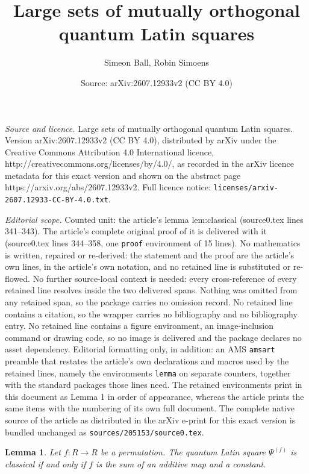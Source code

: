 \documentclass[10pt,a4paper]{amsart}
\title{Large sets of mutually orthogonal quantum Latin squares}
\author{Simeon Ball, Robin Simoens}
\date{Source: arXiv:2607.12933v2 (CC BY 4.0)}
\newtheorem{lemma}{Lemma}
\begin{document}
\maketitle

\noindent\emph{Source and licence.} Large sets of mutually orthogonal quantum Latin squares. Version arXiv:2607.12933v2 (CC BY 4.0), distributed by arXiv under the Creative Commons Attribution 4.0 International licence, http://creativecommons.org/licenses/by/4.0/, as recorded in the arXiv licence metadata for this exact version and shown on the abstract page https://arxiv.org/abs/2607.12933v2. Full licence notice: \texttt{licenses/arxiv-2607.12933-CC-BY-4.0.txt}.\par\smallskip

\noindent\textit{Editorial scope.} Counted unit: the article's lemma lem:classical (source0.tex lines 341--343). The article's complete original proof of it is delivered with it (source0.tex lines 344--358, one \texttt{proof} environment of 15 lines). No mathematics is written, repaired or re-derived: the statement and the proof are the article's own lines, in the article's own notation, and no retained line is substituted or re-flowed.  No further source-local context is needed: every cross-reference of every retained line resolves inside the two delivered spans.  Nothing was omitted from any retained span, so the package carries no omission record.  No retained line contains a citation, so the wrapper carries no bibliography and no bibliography entry.  No retained line contains a figure environment, an image-inclusion command or drawing code, so no image is delivered and the package declares no asset dependency.  Editorial formatting only, in addition: an AMS \texttt{amsart} preamble that restates the article's own declarations and macros used by the retained lines, namely the environments \texttt{lemma} on separate counters, together with the standard packages those lines need.  The retained environments print in this document as Lemma 1 in order of appearance, whereas the article prints the same items with the numbering of its own full document.  The complete native source of the article as distributed in the arXiv e-print for this exact version is bundled unchanged as \texttt{sources/205153/source0.tex}.
\begin{lemma}\label{lem:classical}
    Let \(f:R\to R\) be a permutation. The quantum Latin square \(\Psi^{(f)}\) is classical if and only if \(f\) is the sum of an additive map and a constant.
\end{lemma}
\end{document}
